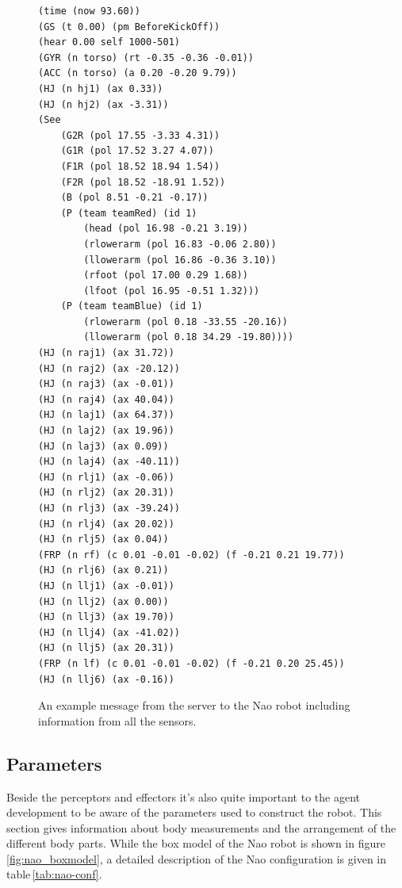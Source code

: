 \begin{figure}[htbp]
 \centering
\lstset{language=SSML}
\begin{lstlisting}
(time (now 93.60)) 
(GS (t 0.00) (pm BeforeKickOff))
(hear 0.00 self 1000-501)
(GYR (n torso) (rt -0.35 -0.36 -0.01))
(ACC (n torso) (a 0.20 -0.20 9.79))
(HJ (n hj1) (ax 0.33))
(HJ (n hj2) (ax -3.31))
(See 
    (G2R (pol 17.55 -3.33 4.31)) 
    (G1R (pol 17.52 3.27 4.07))
    (F1R (pol 18.52 18.94 1.54))
    (F2R (pol 18.52 -18.91 1.52))
    (B (pol 8.51 -0.21 -0.17))
    (P (team teamRed) (id 1)
        (head (pol 16.98 -0.21 3.19))
        (rlowerarm (pol 16.83 -0.06 2.80))
        (llowerarm (pol 16.86 -0.36 3.10))
        (rfoot (pol 17.00 0.29 1.68))
        (lfoot (pol 16.95 -0.51 1.32)))
    (P (team teamBlue) (id 1) 
        (rlowerarm (pol 0.18 -33.55 -20.16))
        (llowerarm (pol 0.18 34.29 -19.80))))
(HJ (n raj1) (ax 31.72))
(HJ (n raj2) (ax -20.12))
(HJ (n raj3) (ax -0.01))
(HJ (n raj4) (ax 40.04))
(HJ (n laj1) (ax 64.37))
(HJ (n laj2) (ax 19.96))
(HJ (n laj3) (ax 0.09))
(HJ (n laj4) (ax -40.11))
(HJ (n rlj1) (ax -0.06))
(HJ (n rlj2) (ax 20.31))
(HJ (n rlj3) (ax -39.24))
(HJ (n rlj4) (ax 20.02))
(HJ (n rlj5) (ax 0.04))
(FRP (n rf) (c 0.01 -0.01 -0.02) (f -0.21 0.21 19.77))
(HJ (n rlj6) (ax 0.21))
(HJ (n llj1) (ax -0.01))
(HJ (n llj2) (ax 0.00))
(HJ (n llj3) (ax 19.70))
(HJ (n llj4) (ax -41.02))
(HJ (n llj5) (ax 20.31))
(FRP (n lf) (c 0.01 -0.01 -0.02) (f -0.21 0.20 25.45))
(HJ (n llj6) (ax -0.16))
\end{lstlisting}
 \caption{An example message from the server to the Nao robot including information from all the sensors.}
 \label{fig:nao_examplemsg}
\end{figure}



\subsection{Parameters}
Beside the perceptors and effectors it's also quite important to the agent
development to be aware of the parameters used to construct the robot. This
section gives information about body measurements and the arrangement of the
different body parts. While the box model of the Nao robot is shown in figure
\ref{fig:nao_boxmodel}, a detailed description of the Nao configuration is given
in table\,\ref{tab:nao-conf}.

